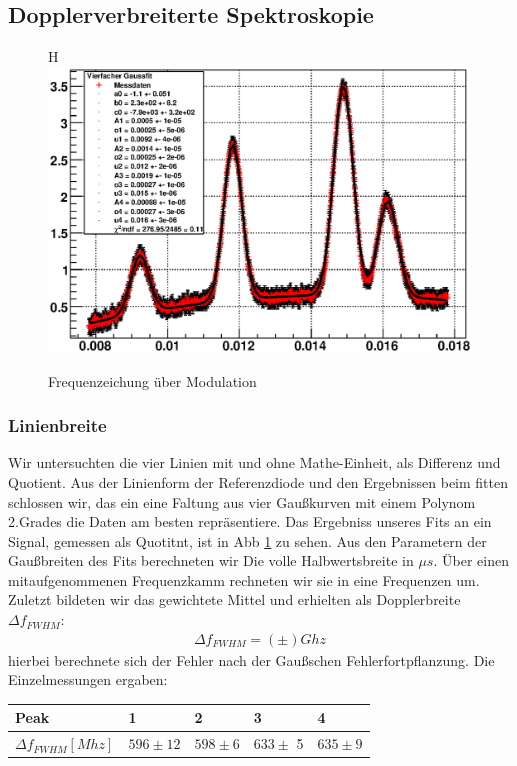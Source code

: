 \documentclass[12pt]{article}
\begin{document}
\subsection{Dopplerverbreiterte Spektroskopie}
\begin{figure}H
 \includegraphics[width=0.9\linewidth]{pictures/doppler.eps}
 \caption{Frequenzeichung über Modulation}
 \label{doppler}
\end{figure}
\subsubsection{Linienbreite}
Wir untersuchten die vier Linien mit und ohne Mathe-Einheit, als Differenz und Quotient. Aus der Linienform der Referenzdiode und den Ergebnissen beim fitten schlossen wir, das ein eine Faltung aus vier Gaußkurven mit einem Polynom 2.Grades die Daten am besten repräsentiere. Das Ergebniss unseres Fits an ein Signal, gemessen als Quotitnt, ist in Abb \ref{doppler} zu sehen. Aus den Parametern der Gaußbreiten des Fits berechneten wir Die volle Halbwertsbreite in $\mu s$. Über einen mitaufgenommenen Frequenzkamm rechneten wir sie in eine Frequenzen um. Zuletzt bildeten wir das gewichtete Mittel und erhielten als Dopplerbreite $\Delta f_{FWHM}$:
\begin{align*}
 \Delta f_{FWHM} = (\pm) Ghz 
\end{align*}
hierbei berechnete sich der Fehler nach der Gaußschen Fehlerfortpflanzung. Die Einzelmessungen ergaben:
\begin{center}
\begin{tabular}{|l|llll|}
\hline
Peak & 1 & 2 & 3 & 4\\
\hline
$\Delta f_{FWHM} [Mhz]$ & $596\pm12$ & $598 \pm 6$ & $633 \pm$ 5 & $635 \pm 9$\\
\hline
\end{tabular}
\end{center}
\end{document}
